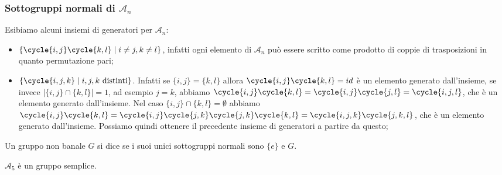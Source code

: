 \documentclass[11pt]{scrartcl}
\begin{document}
\subsubsection{Sottogruppi normali di $\mathcal{A}_n$}

Esibiamo alcuni insiemi di generatori per $\mathcal{A}_n$:
\begin{itemize}
    \item $\{\cycle{i, j}\cycle{k, l}\mid i\neq j, k \neq l\}$, infatti
    ogni elemento di $\mathcal{A}_n$ può essere scritto come prodotto di 
    coppie di trasposizioni in quanto permutazione pari;
    \item $\{\cycle{i, j, k}\mid i, j, k\text{ distinti}\}$. Infatti se 
    $\{i, j\} = \{k, l\}$ allora $\cycle{i, j}\cycle{k, l} = id$ è un elemento
    generato dall'insieme, se invece $|\{i, j\}\cap\{k, l\}| = 1$, ad esempio $j = k$,
    abbiamo $\cycle{i, j}\cycle{k, l} = \cycle{i, j}\cycle{j, l} = \cycle{i, j, l}$,
    che è un elemento generato dall'insieme. Nel caso $\{i, j\}\cap \{k, l\} = \emptyset$ abbiamo
    $\cycle{i, j}\cycle{k, l} = \cycle{i, j}\cycle{j, k}\cycle{j, k}\cycle{k, l}=
    \cycle{i, j, k}\cycle{j, k, l}$, che è un elemento generato dall'insieme.
    Possiamo quindi ottenere il precedente insieme di generatori a partire
    da questo;
\end{itemize}

\begin{definition}
    Un gruppo non banale $G$ si dice  se i suoi unici sottogruppi
    normali sono $\{e\}$ e $G$.
\end{definition}


\begin{proposition}
    \label{prop3.0}
    $\mathcal{A}_5$ è un gruppo semplice.
\end{proposition}
\end{document}
